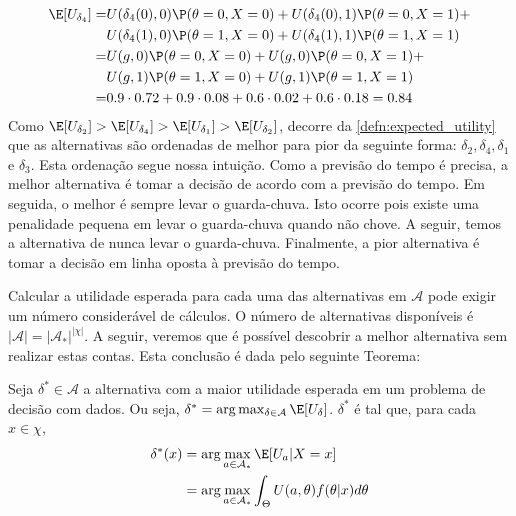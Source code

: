 \begin{example}
\begin{align*}
 \end{align*}
 \begin{align*}
  \E[U_{\delta_{4}}]
  =& U(\delta_{4}(0),0)\P(\theta=0,X=0) +
  U(\delta_{4}(0),1)\P(\theta=0,X=1) + \\
  & U(\delta_{4}(1),0)\P(\theta=1,X=0) +
  U(\delta_{4}(1),1)\P(\theta=1,X=1) \\
  =& U(g,0)\P(\theta=0,X=0) +
  U(g,0)\P(\theta=0,X=1) + \\
  & U(g,1)\P(\theta=1,X=0) +
  U(g,1)\P(\theta=1,X=1) \\
  =& 0.9 \cdot 0.72 + 0.9 \cdot 0.08
  + 0.6 \cdot 0.02 + 0.6 \cdot 0.18 = 0.84
 \end{align*}
 Como $\E[U_{\delta_{2}}] > \E[U_{\delta_{4}}] > \E[U_{\delta_{1}}] > \E[U_{\delta_{2}}]$,
 decorre da \cref{defn:expected_utility} que as 
 alternativas são ordenadas de melhor para
 pior da seguinte forma:
 $\delta_{2}, \delta_{4}, \delta_{1}$ e $\delta_{3}$.
 Esta ordenação segue nossa intuição.
 Como a previsão do tempo é precisa,
 a melhor alternativa é tomar a decisão de
 acordo com a previsão do tempo.
 Em seguida, o melhor é sempre levar o guarda-chuva.
 Isto ocorre pois existe uma penalidade pequena em
 levar o guarda-chuva quando não chove.
 A seguir, temos a alternativa de nunca
 levar o guarda-chuva.
 Finalmente, a pior alternativa é tomar a
 decisão em linha oposta à previsão do tempo.
\end{example}

Calcular a utilidade esperada para cada uma das alternativas em $\mathcal{A}$
pode exigir um número considerável de cálculos.
O número de alternativas disponíveis é
$|\mathcal{A}| = |\mathcal{A}_{*}|^{|\chi|}$. 
A seguir, veremos que é possível descobrir a melhor alternativa sem realizar estas contas.
Esta conclusão é dada pelo seguinte Teorema:

\begin{theorem}
 \label{theorem:extensive-form}
 Seja $\delta^{*} \in \mathcal{A}$ a alternativa com a
 maior utilidade esperada em um
 problema de decisão com dados.
 Ou seja, $\delta^{*} = \arg\max_{\delta \in \mathcal{A}}\E[U_{\delta}]$.
 $\delta^{*}$ é tal que, para cada $x \in \chi$,
 \begin{align*}
  \delta^{*}(x)
  &= \arg\max_{a \in \mathcal{A}_{*}}\E[U_{a}|X=x] \\
  &= \arg\max_{a \in \mathcal{A}_{*}}\int_{\Theta
  }{U(a,\theta)f(\theta|x)d\theta}
 \end{align*}
\end{theorem}

